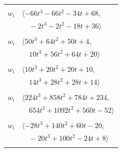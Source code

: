 \documentclass[11pt]{article}
\begin{document}
\begin{longtable}{@{}ll@{}}
\addlinespace[2pt]
\multicolumn{2}{@{}p{0.97\textwidth}@{}}{$i=60$, $D_i=10$, $\rho_{ij}$: $2{:}1, \allowbreak 9{:}1, \allowbreak 10{:}1, \allowbreak 15{:}1, \allowbreak 19{:}1, \allowbreak 21{:}1, \allowbreak 34{:}1, \allowbreak 43{:}1, \allowbreak 53{:}1, \allowbreak 63{:}1, \allowbreak 66{:}2, \allowbreak 68{:}1$}\\
$w_i$ & $\langle -66t^{3}-66t^{2}-34t+68,$\\
 & $\quad -2t^{3}-2t^{2}-18t+36\rangle$\\
\addlinespace[2pt]
\multicolumn{2}{@{}p{0.97\textwidth}@{}}{$i=61$, $D_i=2$, $\rho_{ij}$: $22{:}2, \allowbreak 29{:}1, \allowbreak 37{:}2, \allowbreak 42{:}2, \allowbreak 44{:}1, \allowbreak 49{:}2, \allowbreak 58{:}1, \allowbreak 64{:}2, \allowbreak 71{:}2$}\\
$w_i$ & $\langle 50t^{3}+64t^{2}+50t+4,$\\
 & $\quad 10t^{3}+56t^{2}+64t+20\rangle$\\
\addlinespace[2pt]
\multicolumn{2}{@{}p{0.97\textwidth}@{}}{$i=62$, $D_i=1$, $\rho_{ij}$: $3{:}2, \allowbreak 26{:}2, \allowbreak 43{:}1, \allowbreak 52{:}1, \allowbreak 56{:}1, \allowbreak 71{:}1$}\\
$w_i$ & $\langle 10t^{3}+20t^{2}+20t+10,$\\
 & $\quad 14t^{3}+28t^{2}+28t+14\rangle$\\
\addlinespace[2pt]
\multicolumn{2}{@{}p{0.97\textwidth}@{}}{$i=63$, $D_i=16$, $\rho_{ij}$: $3{:}1, \allowbreak 7{:}1, \allowbreak 9{:}1, \allowbreak 10{:}1, \allowbreak 21{:}2, \allowbreak 30{:}1, \allowbreak 38{:}2, \allowbreak 40{:}2, \allowbreak 53{:}1, \allowbreak 60{:}2, \allowbreak 64{:}1, \allowbreak 71{:}2, \allowbreak 73{:}1$}\\
$w_i$ & $\langle 224t^{3}+858t^{2}+784t+234,$\\
 & $\quad 654t^{3}+1092t^{2}+560t-52\rangle$\\
\addlinespace[2pt]
\multicolumn{2}{@{}p{0.97\textwidth}@{}}{$i=64$, $D_i=4$, $\rho_{ij}$: $7{:}2, \allowbreak 10{:}2, \allowbreak 11{:}1, \allowbreak 29{:}2, \allowbreak 31{:}1, \allowbreak 42{:}2, \allowbreak 49{:}1, \allowbreak 54{:}1, \allowbreak 57{:}2, \allowbreak 61{:}1, \allowbreak 63{:}2$}\\
$w_i$ & $\langle -28t^{3}+140t^{2}+60t-20,$\\
 & $\quad -20t^{3}+100t^{2}-24t+8\rangle$\\
\addlinespace[2pt]
\multicolumn{2}{@{}p{0.97\textwidth}@{}}{$i=65$, $D_i=2$, $\rho_{ij}$: $3{:}1, \allowbreak 8{:}2, \allowbreak 14{:}2, \allowbreak 16{:}1, \allowbreak 18{:}1, \allowbreak 20{:}1, \allowbreak 29{:}2, \allowbreak 69{:}1$}\\

\end{longtable}
\end{document}
